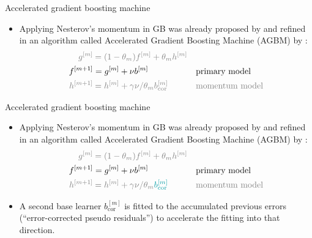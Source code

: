 \documentclass[t,10pt]{beamer}
\begin{document}
\begin{frame}{Accelerated gradient boosting machine}
  \begin{itemize}
    \item
      Applying Nesterov's momentum in GB was already proposed by \cite{biau2019accelerated} and refined in an algorithm called Accelerated Gradient Boosting Machine (AGBM) by \cite{lu2020accelerating}:
      \begin{alignat*}{2}
      {\color{gray}g^{[m]}} &{\color{gray}\hspace{0.08cm}= (1 - \theta_m) f^{[m]} + \theta_m h^{[m]}}             &&\\
      f^{[m+1]} &= g^{[m]} + \nu b^{[m]}                               &&\text{primary model}\\
      {\color{gray}h^{[m+1]}} &{\color{gray}\hspace{0.08cm}= h^{[m]} + \gamma\nu / \theta_m b^{[m]}_{\text{cor}}} &&{\color{gray}\text{momentum model}}
      \end{alignat*}
  \end{itemize}
  \addtocounter{framenumber}{-1}
\end{frame}

\begin{frame}{Accelerated gradient boosting machine}
  \begin{itemize}
    \item
      Applying Nesterov's momentum in GB was already proposed by \cite{biau2019accelerated} and refined in an algorithm called Accelerated Gradient Boosting Machine (AGBM) by \cite{lu2020accelerating}:
      \begin{alignat*}{2}
      {\color{gray}g^{[m]}} &{\color{gray}\hspace{0.08cm}= (1 - \theta_m) f^{[m]} + \theta_m h^{[m]}}             &&\\
      f^{[m+1]} &= g^{[m]} + \nu b^{[m]}                               &&\text{primary model}\\
      {\color{gray}h^{[m+1]}} &{\color{gray}\hspace{0.08cm}= h^{[m]} + \gamma\nu / \theta_m} {\color{blue}b^{[m]}_{\text{cor}}} &&{\color{gray}\text{momentum model}}
      \end{alignat*}
      \item A {\color{blue}second base learner $b^{[m]}_{\text{cor}}$} is fitted to the accumulated previous errors (\enquote{error-corrected pseudo residuals}) to accelerate the fitting into that direction.
  \end{itemize}
  \addtocounter{framenumber}{-1}
\end{frame}
\end{document}
